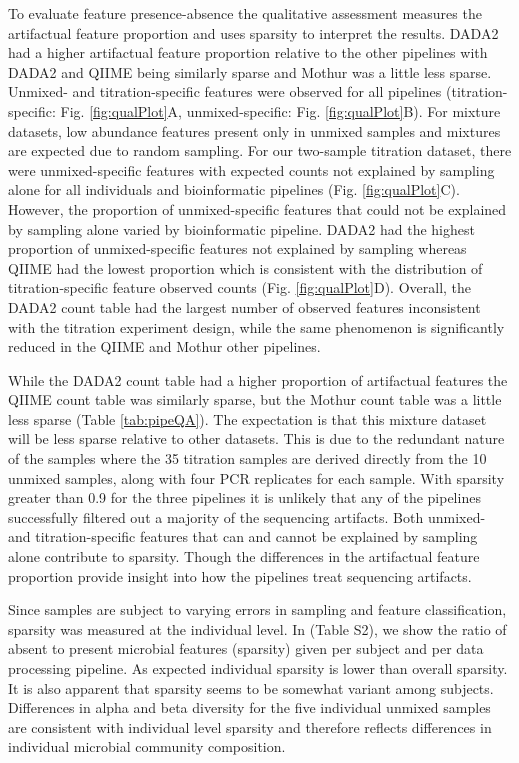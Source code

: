 \documentclass{bmcart}
\begin{document}
To evaluate feature presence-absence the qualitative assessment measures
the artifactual feature proportion and uses sparsity to interpret the results.
DADA2 had a higher artifactual feature proportion relative to the other
pipelines with DADA2 and QIIME being similarly sparse and Mothur was a little less sparse.
Unmixed- and titration-specific features were observed for all pipelines
(titration-specific: Fig. \ref{fig:qualPlot}A, unmixed-specific: Fig.
\ref{fig:qualPlot}B).
For mixture datasets, low abundance features
present only in unmixed samples and mixtures are expected due to random
sampling. For our two-sample titration dataset, there were
unmixed-specific features with expected counts not explained by sampling
alone for all individuals and bioinformatic pipelines (Fig.
\ref{fig:qualPlot}C). However, the proportion of unmixed-specific
features that could not be explained by sampling alone varied by
bioinformatic pipeline. DADA2 had the highest proportion of
unmixed-specific features not explained by sampling whereas QIIME had
the lowest proportion which is consistent with the distribution
of titration-specific feature observed counts (Fig. \ref{fig:qualPlot}D).
Overall, the DADA2 count table had the largest
number of observed features inconsistent with the titration experiment
design, while the same phenomenon is significantly reduced in the QIIME and Mothur other pipelines.

While the DADA2 count table had a higher proportion of artifactual features the
QIIME count table was similarly sparse, but the Mothur count table was a little less sparse (Table \ref{tab:pipeQA}).
The expectation is that this mixture dataset will be less sparse relative to other datasets.
This is due to the redundant nature of the samples where the 35 titration samples are derived
directly from the 10 unmixed samples, along with four PCR replicates for
each sample. With sparsity greater than 0.9 for the three pipelines it
is unlikely that any of the pipelines successfully filtered out a
majority of the sequencing artifacts. Both unmixed- and titration-specific
features that can and cannot be explained by sampling alone contribute
to sparsity. Though the differences in the artifactual feature proportion
provide insight into how the pipelines treat sequencing artifacts.

Since samples are subject to varying errors in sampling and feature classification, 
sparsity was measured at the individual level. 
In (Table S2), we show the ratio of absent to present microbial features (sparsity) given per subject and per data processing pipeline. 
As expected individual sparsity is lower than overall sparsity. 
It is also apparent that sparsity seems to be somewhat variant among subjects. 
Differences in alpha and beta diversity for the five individual unmixed samples are consistent with individual level sparsity and therefore reflects differences in individual microbial community composition.
\end{document}
